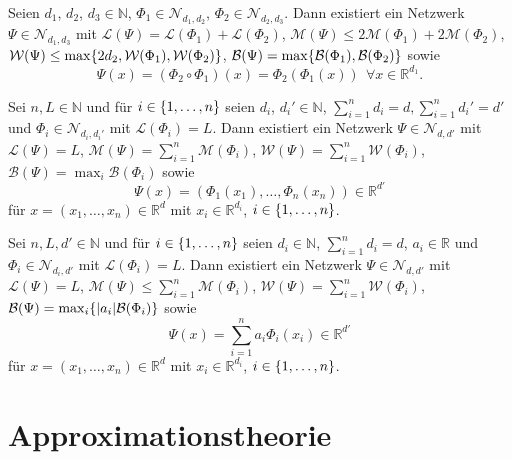 \documentclass[11pt]{scrartcl}
\newcommand{\N}{\mathbb{N}} %
\newcommand{\R}{\mathbb{R}} %
\begin{document}
\begin{lemma}
    Seien \(d_1\), \(d_2\), \(d_3 \in \N\), \(\Phi_1 \in \mathcal{N}_{d_1, d_2}\), \(\Phi_2 \in \mathcal{N}_{d_2, d_3}\). Dann existiert ein 
    Netzwerk \(\Psi \in \mathcal{N}_{d_1, d_3}\) mit \(\mathcal{L}(\Psi) = \mathcal{L}(\Phi_1) + \mathcal{L}(\Phi_2)\), 
    \(\mathcal{M}(\Psi) \leq 2 \mathcal{M}(\Phi_1) + 2\mathcal{M}(\Phi_2)\), \(\mathcal{W}(\Psi) \leq 
    \max\{2d_2, \mathcal{W}(\Phi_1), \mathcal{W}(\Phi_2)\}\), \(\mathcal{B}(\Psi) = \max\{\mathcal{B}(\Phi_1), \mathcal{B}(\Phi_2)\}\) 
    sowie
    \[ \Psi(x) = (\Phi_2 \circ \Phi_1)(x) = \Phi_2(\Phi_1(x)) \ \ \forall x\in \R^{d_1}. \]
\end{lemma}

\begin{lemma}
    Sei \(n, L \in\N\) und für \(i\in \{1,\ldots, n\}\) seien \(d_i\), \(d_i' \in \N\), \( \sum_{i=1}^n d_i = d, \sum_{i=1}^n d_i' = d'\)
    und \(\Phi_i \in \mathcal{N}_{d_i, d_i'}\) 
    mit \(\mathcal{L}(\Phi_i) = L\). Dann existiert ein Netzwerk \(\Psi \in \mathcal{N}_{d, d'}\) 
    mit \(\mathcal{L}(\Psi) = L\), \(\mathcal{M}(\Psi) = \sum_{i=1}^n \mathcal{M}(\Phi_i)\), 
    \(\mathcal{W}(\Psi) = \sum_{i=1}^n \mathcal{W}(\Phi_i)\), \(\mathcal{B}(\Psi) = \max_i \mathcal{B}(\Phi_i)\) sowie 
    \[ \Psi(x) = (\Phi_1(x_1), \ldots, \Phi_n(x_n)) \in \R^{d'} \]
    für \(x = (x_1, \ldots, x_n) \in \R^{d}\) mit \(x_i \in \R^{d_i}\), \(i\in \{1,\ldots, n\}\).
\end{lemma}

\begin{lemma}
    Sei \(n, L, d' \in\N\) und für \(i\in \{1,\ldots, n\}\) seien \(d_i \in \N\), \(\sum_{i=1}^n d_i = d\), \(a_i \in \R\) und \(\Phi_i \in \mathcal{N}_{d_i, d'}\) 
    mit \(\mathcal{L}(\Phi_i) = L\). Dann existiert ein Netzwerk \(\Psi \in \mathcal{N}_{d, d'}\) 
    mit \(\mathcal{L}(\Psi) = L\), \(\mathcal{M}(\Psi) \leq \sum_{i=1}^n \mathcal{M}(\Phi_i)\), 
    \(\mathcal{W}(\Psi) = \sum_{i=1}^n \mathcal{W}(\Phi_i)\), \(\mathcal{B}(\Psi) = \max_i \{|a_i| \mathcal{B}(\Phi_i)\}\) sowie 
    \[ \Psi(x) = \sum_{i=1}^n a_i \Phi_i(x_i) \in \R^{d'} \]
    für \(x = (x_1, \ldots, x_n) \in \R^{d}\) mit \(x_i \in \R^{d_i}\), \(i\in \{1,\ldots, n\}\).
\end{lemma}

\section{Approximationstheorie}
\end{document}

